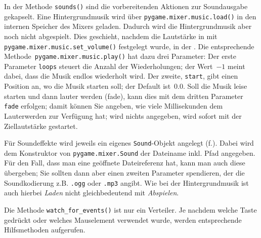 In der Methode \texttt{sounds()} sind die vorbereitenden Aktionen zur Soundausgabe gekapselt. Eine Hintergrundmusik wird über \texttt{pygame.mixer.music.load()} in den internen Speicher des Mixers geladen. Dadurch wird die Hintergrundmusik aber noch nicht abgespielt. Dies geschieht, nachdem die Lautstärke in  mit \texttt{pygame.mixer.music.set\-\_vol\-ume()} festgelegt wurde, in der . Die entsprechende Methode\texttt{ pygame.mixer\-.mu\-sic.play()} hat dazu drei Parameter: Der erste Parameter \texttt{loops} steuert die Anzahl der Wiederholungen; der Wert~$-1$ meint dabei, dass die Musik endlos wiederholt wird. Der zweite, \texttt{start}, gibt einen Position an, wo die Musik starten soll; der Default ist~$0.0$. Soll die Musik leise starten und dann lauter werden (\gls{fade}), kann dies mit dem dritten Parameter \texttt{fade} erfolgen; damit können Sie angeben, wie viele Millisekunden dem Lauterwerden zur Verfügung hat; wird nichts angegeben, wird sofort mit der Ziellautstärke gestartet. 

Für Soundeffekte wird jeweils ein eigenes \texttt{Sound}-Objekt angelegt (f.). Dabei wird dem Konstruktor von \texttt{pygame.mixer.Sound} der Dateiname inkl. Pfad angegeben. Für den Fall, dass man eine geöffnete Dateireferenz hat, kann man auch diese übergeben; Sie sollten dann aber einen zweiten Parameter spendieren, der die Soundkodierung z.B. \texttt{.\gls{ogg}} oder \texttt{.\gls{mp3}} angibt. Wie bei der Hintergrundmusik ist auch hierbei \emph{Laden} nicht gleichbedeutend mit \emph{Abspielen}.


Die Methode \texttt{watch\_for\_events()} ist nur ein Verteiler. Je nachdem welche Taste gedrückt oder welches Mauselement verwendet wurde, werden entsprechende Hilfsmethoden aufgerufen.


